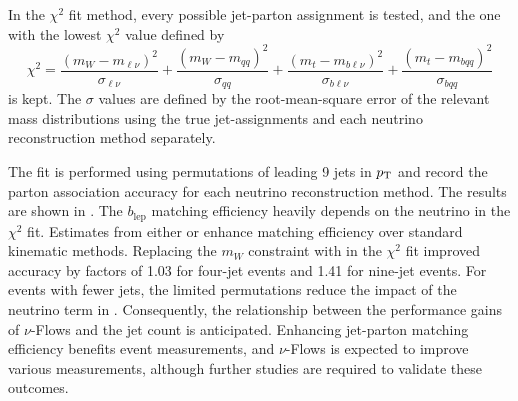In the $\chi^2$ fit method, every possible jet-parton assignment is tested, and the one with the lowest $\chi^2$ value defined by
\begin{equation}
    \chi^2=\frac{(m_W-m_{\ell\nu})^2}{\sigma_{\ell\nu}} +\frac{(m_W-m_{qq})^2}{\sigma_{qq}} +\frac{(m_t-m_{b\ell\nu})^2}{\sigma_{b\ell\nu}} +\frac{(m_t-m_{bqq})^2}{\sigma_{bqq}}
    \label{eq:chi_square}
\end{equation}
is kept.
The $\sigma$ values are defined by the root-mean-square error of the relevant mass distributions using the true jet-assignments and each neutrino reconstruction method separately.

The fit is performed using permutations of leading 9 jets in $p_\mathrm{T}$ and record the parton association accuracy for each neutrino reconstruction method.
The results are shown in .
The $b_\text{lep}$ matching efficiency heavily depends on the neutrino in the $\chi^2$ fit.
Estimates from either \vsample or \vmode enhance matching efficiency over standard kinematic methods.
Replacing the $m_W$ constraint with \vmode in the $\chi^2$ fit improved accuracy by factors of 1.03 for four-jet events and 1.41 for nine-jet events.
For events with fewer jets, the limited permutations reduce the impact of the neutrino term in .
Consequently, the relationship between the performance gains of $\nu$-Flows and the jet count is anticipated.
Enhancing jet-parton matching efficiency benefits \ttbar event measurements, and $\nu$-Flows is expected to improve various measurements, although further studies are required to validate these outcomes.

